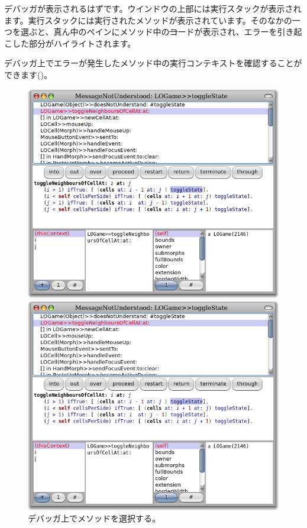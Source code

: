 \documentclass[a4paper,10pt,twoside]{book}
\begin{document}

デバッガが表示されるはずです。ウインドウの上部には実行スタックが表示されます。実行スタックには実行されたメソッドが表示されています。そのなかの一つを選ぶと、真ん中のペインにメソッド中の\st コードが表示され、エラーを引き起こした部分がハイライトされます。


デバッガ上でエラーが発生したメソッド中の実行コンテキストを確認することができます()。

\begin{figure}[ht]
\ifluluelse
	{\centerline {\includegraphics[width=\textwidth]{Debugger}}}
	{\centerline {\includegraphics[scale=0.7]{Debugger}}}
\caption{デバッガ上でメソッドを選択する。
}
\end{figure}
\end{document}
